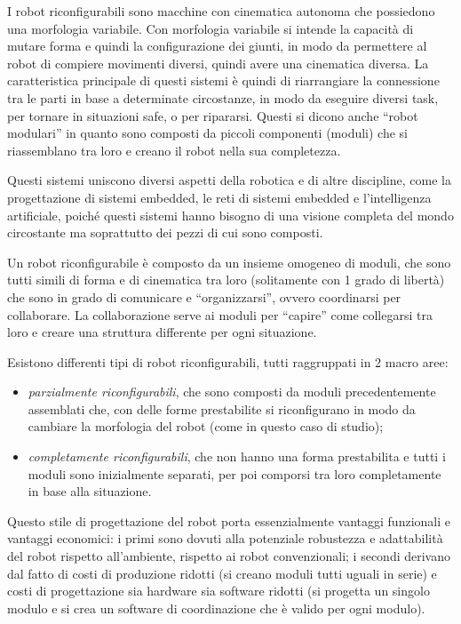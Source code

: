 \documentclass[11pt]{article} %
\begin{document}
I robot riconfigurabili sono macchine con cinematica autonoma che possiedono una morfologia variabile. Con morfologia variabile si intende la capacità di mutare forma e quindi la configurazione dei giunti, in modo da permettere al robot di compiere movimenti diversi, quindi avere una cinematica diversa. La caratteristica principale di questi sistemi è quindi di riarrangiare la connessione tra le parti in base a determinate circostanze, in modo da eseguire diversi task, per tornare in situazioni safe, o per ripararsi.
Questi si dicono anche ``robot modulari'' in quanto sono composti da piccoli componenti (moduli) che si riassemblano tra loro e creano il robot nella sua completezza.

Questi sistemi uniscono diversi aspetti della robotica e di altre discipline, come la progettazione di sistemi embedded, le reti di sistemi embedded e l'intelligenza artificiale, poiché questi sistemi hanno bisogno di una visione completa del mondo circostante ma soprattutto dei pezzi di cui sono composti.

Un robot riconfigurabile è composto da un insieme omogeneo di moduli, che sono tutti simili di forma e di cinematica tra loro (solitamente con 1 grado di libertà) che sono in grado di comunicare e ``organizzarsi'', ovvero coordinarsi per collaborare. La collaborazione serve ai moduli per ``capire'' come collegarsi tra loro e creare una struttura differente per ogni situazione.

Esistono differenti tipi di robot riconfigurabili, tutti raggruppati in 2 macro aree:
\begin{itemize}
  \item \textit{parzialmente riconfigurabili}, che sono composti da moduli precedentemente assemblati che, con delle forme prestabilite si riconfigurano in modo da cambiare la morfologia del robot (come in questo caso di studio);
  \item \textit{completamente riconfigurabili}, che non hanno una forma prestabilita e tutti i moduli sono inizialmente separati, per poi comporsi tra loro completamente in base alla situazione.
\end{itemize}

Questo stile di progettazione del robot porta essenzialmente vantaggi funzionali e vantaggi economici: i primi sono dovuti alla potenziale robustezza e adattabilità del robot rispetto all'ambiente, rispetto ai robot convenzionali; i secondi derivano dal fatto di costi di produzione ridotti (si creano moduli tutti uguali in serie) e costi di progettazione sia hardware sia software ridotti (si progetta un singolo modulo e si crea un software di coordinazione che è valido per ogni modulo).
\end{document}
